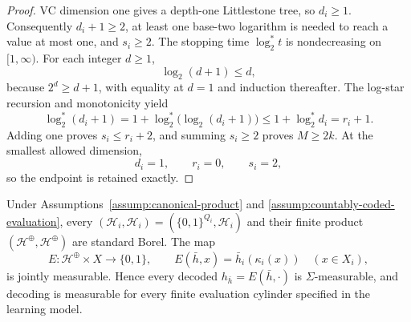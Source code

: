 \begin{proof}
VC dimension one gives a depth-one Littlestone tree, so \(d_i\ge1\).
Consequently \(d_i+1\ge2\), at least one base-two logarithm is needed to
reach a value at most one, and \(s_i\ge2\).  The stopping time
\(\log_2^*t\) is nondecreasing on \([1,\infty)\).  For each integer
\(d\ge1\),
\begin{equation}\label{eq:step-001-log-elementary}
\log_2(d+1)\le d,
\end{equation}
because \(2^d\ge d+1\), with equality at \(d=1\) and induction thereafter.
The log-star recursion and monotonicity yield
\begin{equation}\label{eq:step-001-logstar-comparison}
\log_2^*(d_i+1)
=1+\log_2^*\!\bigl(\log_2(d_i+1)\bigr)
\le1+\log_2^*d_i=r_i+1.
\end{equation}
Adding one proves \(s_i\le r_i+2\), and summing \(s_i\ge2\) proves
\(M\ge2k\).  At the smallest allowed dimension,
\[
d_i=1,\qquad r_i=0,\qquad s_i=2,
\]
so the endpoint is retained exactly.
\end{proof}

\begin{lemma}
\label{lem:step-001-output-measurability}
Under Assumptions~\ref{assump:canonical-product} and
\ref{assump:countably-coded-evaluation}, every
\((\mathcal H_i,\mathscr H_i)=(\{0,1\}^{Q_i},\mathscr H_i)\) and their
finite product \((\mathcal H^{\oplus},\mathscr H^{\oplus})\) are standard
Borel.  The map
\[
E:\mathcal H^{\oplus}\times X\to\{0,1\},
\qquad E(\bar h,x)=\bar h_i(\kappa_i(x))\quad(x\in X_i),
\]
is jointly measurable.  Hence every decoded \(h_{\bar h}=E(\bar h,\cdot)\)
is \(\Sigma\)-measurable, and decoding is measurable for every finite
evaluation cylinder specified in the learning model.
\end{lemma}

